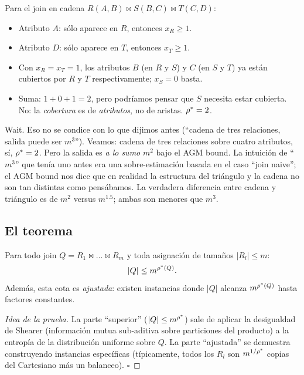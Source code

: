 \begin{ejemplo}[Cadena]
Para el join en cadena
\(R(A, B) \bowtie S(B, C) \bowtie T(C, D)\):
\begin{itemize}
    \item Atributo \(A\): sólo aparece en \(R\), entonces
    \(x_R \geq 1\).
    \item Atributo \(D\): sólo aparece en \(T\), entonces
    \(x_T \geq 1\).
    \item Con \(x_R = x_T = 1\), los atributos \(B\) (en \(R\) y
    \(S\)) y \(C\) (en \(S\) y \(T\)) ya están cubiertos por
    \(R\) y \(T\) respectivamente; \(x_S = 0\) basta.
    \item Suma: \(1 + 0 + 1 = 2\), pero podríamos pensar que \(S\)
    necesita estar cubierta. No: la \emph{cobertura} es de
    \emph{atributos}, no de aristas. \(\rho^{*} = 2\).
\end{itemize}

Wait. Eso no se condice con lo que dijimos antes (``cadena de tres
relaciones, salida puede ser \(m^3\)''). Veamos: cadena de tres
relaciones sobre cuatro atributos, sí, \(\rho^{*} = 2\). Pero la
salida es \emph{a lo sumo} \(m^2\) bajo el AGM bound. La intuición
de ``\(m^3\)'' que tenía uno antes era una sobre-estimación basada
en el caso ``join naive''; el AGM bound nos dice que en realidad la
estructura del triángulo y la cadena no son tan distintas como
pensábamos. La verdadera diferencia entre cadena y triángulo es de
\(m^2\) versus \(m^{1.5}\); ambas son menores que \(m^3\).
\end{ejemplo}

\subsection{El teorema}

\begin{theorem}
Para todo join \(Q = R_1 \bowtie \dots \bowtie R_m\) y toda
asignación de tamaños \(|R_l| \leq m\):
\[
|Q| \leq m^{\rho^{*}(Q)}.
\]
Además, esta cota es \emph{ajustada}: existen instancias donde
\(|Q|\) alcanza \(m^{\rho^{*}(Q)}\) hasta factores constantes.
\end{theorem}

\begin{proof}[Idea de la prueba]
La parte ``superior'' (\(|Q| \leq m^{\rho^{*}}\)) sale de aplicar la
desigualdad de Shearer (información mutua sub-aditiva sobre
particiones del producto) a la entropía de la distribución uniforme
sobre \(Q\). La parte ``ajustada'' se demuestra construyendo
instancias específicas (típicamente, todos los \(R_l\) son
\(m^{1/\rho^{*}}\) copias del Cartesiano más un balanceo). \(\square\)
\end{proof}

